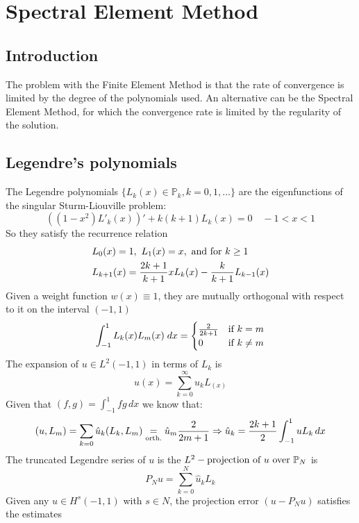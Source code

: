 \newpage
\section{Spectral Element Method}
\subsection{Introduction}
The problem with the Finite Element Method is that the rate of convergence is limited by the degree of the polynomials used. An alternative can be the Spectral Element Method, for which the convergence rate is limited by the regularity of the solution. 
\subsection{Legendre's polynomials}
The Legendre polynomials \(\{L_k(x) \in \mathbb{P}_k, k = 0, 1, \ldots\}\) are the eigenfunctions of the singular Sturm-Liouville problem:
\[
    ((1-x^2)L'_k(x))' + k(k+1)L_k(x) = 0 \quad -1 < x < 1
\]
So they satisfy the recurrence relation
\begin{equation}
    \begin{split}
        &L_0(x) = 1, \ L_1(x) = x, \text{ and for } k \geq 1 \\
        &L_{k+1}(x) = \frac{2k+1}{k+1}xL_k(x) - \frac{k}{k+1}L_{k-1}(x)
    \end{split}
    \label{legendre_polynomials}
\end{equation}
Given a weight function \(w(x) \equiv 1\), they are mutually orthogonal with respect to it on the interval \((-1, 1)\)
\[
    \int_{-1}^1 L_k(x)L_m(x) \; dx = \begin{cases}
        \frac{2}{2k+1} & \text{if } k = m \\
        0 & \text{if } k \neq m
    \end{cases}
\]
The expansion of \(u \in L^2(-1,1)\) in terms of \(L_k\) is 
\[
    u(x) = \sum_{k=0}^{\infty} \hat{u}_k L_(x)
\]
Given that \((f,g) = \int_{-1}^1 fg \, dx\) we know that:
\[
    (u,L_m) = \sum_{k=0} \hat{u}_k (L_k, L_m) \underset{\text{orth.}}{=} \hat{u}_m\frac{2}{2m+1} \Rightarrow \hat{u}_k = \frac{2k+1}{2} \int_{-1}^1 u L_k \, dx
\]
The truncated Legendre series of \(u\) is the \(L^2-\text{projection of } u \text{ over } \mathbb{P}_N\) is 
\begin{equation}
    P_Nu = \sum_{k=0}^{N} \hat{u}_k L_k
\end{equation}
Given any \(u \in H^s(-1,1)\) with \(s \in N\), the projection error \((u-P_Nu)\) satisfies the estimates 

